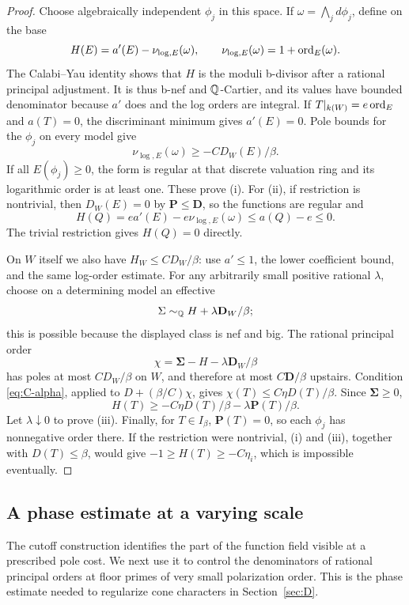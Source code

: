 \begin{proof}
Choose algebraically independent $\phi_j$ in this space.  If
$\omega=\bigwedge_jd\phi_j$, define on the base
\begin{equation}\label{eq:C-logarithmic-order}
 H(E)=a'(E)-\nu_{\log,E}(\omega),\qquad
              \nu_{\log,E}(\omega)=1+\operatorname{ord}_E(\omega).
\end{equation}
The Calabi--Yau identity shows that $H$ is the moduli b-divisor after
a rational principal adjustment.  It is thus b-nef and $\mathbb Q$-Cartier,
and its values have bounded denominator because $a'$ does and the
log orders are integral.  If $T|_{k(W)}=e\operatorname{ord}_E$ and $a(T)=0$, the
discriminant minimum gives $a'(E)=0$.  Pole bounds for the $\phi_j$
on every model give
\[
                  \nu_{\log,E}(\omega)\geq-CD_W(E)/\beta.
\]
If all $E(\phi_j)\geq0$, the form is regular at that discrete
valuation ring and its logarithmic order is at least one.  These prove
(i).  For (ii), if restriction is nontrivial, then
$D_W(E)=0$ by $\mathbf P\leq\mathbf D$, so the functions are regular
and
\[
       H(Q)=e a'(E)-e\nu_{\log,E}(\omega)
                    \leq a(Q)-e\leq0.
\]
The trivial restriction gives $H(Q)=0$ directly.

On $W$ itself we also have $H_W\leq C D_W/\beta$: use $a'\leq1$,
the lower coefficient bound, and the same log-order estimate.  For any
arbitrarily small positive rational $\lambda$, choose on a determining
model an effective
\[
                  \Sigma\sim_\mathbb Q H+\lambda\mathbf D_W/\beta;
\]
this is possible because the displayed class is nef and big.  The
rational principal order
\[
           \chi=\mathbf\Sigma-H-\lambda\mathbf D_W/\beta
\]
has poles at most $C D_W/\beta$ on $W$, and therefore at most
$C\mathbf D/\beta$ upstairs.  Condition \eqref{eq:C-alpha}, applied to
$D+(\beta/C)\chi$, gives
$\chi(T)\leq C\eta D(T)/\beta$.  Since $\mathbf\Sigma\geq0$,
\[
 H(T)\geq-C\eta D(T)/\beta-\lambda\mathbf P(T)/\beta.
\]
Let $\lambda\downarrow0$ to prove (iii).  Finally, for $T\in I_\beta$,
$\mathbf P(T)=0$, so each $\phi_j$ has nonnegative order there.
If the restriction were nontrivial, (i) and (iii), together with
$D(T)\leq\beta$, would give $-1\geq H(T)\geq-C\eta_i$, which is
impossible eventually.
\end{proof}

\subsection{A phase estimate at a varying scale}

The cutoff construction identifies the part of the function field visible
at a prescribed pole cost.  We next use it to control the denominators of
rational principal orders at floor primes of very small polarization
order.  This is the phase estimate needed to regularize cone characters
in Section~\ref{sec:D}.
\label{subsec:C-scaled-phase}

